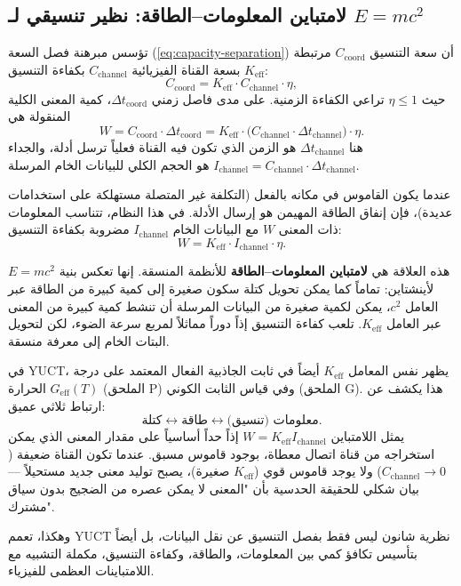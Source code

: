 \documentclass[12pt,a4paper]{article}
\theoremstyle{remark}
\begin{document}
	\subsection{لامتباين المعلومات–الطاقة: نظير تنسيقي لـ \(E=mc^2\)}
	\label{subsec:info_energy_invariant}
	
	تؤسس مبرهنة فصل السعة (\ref{eq:capacity-separation}) أن سعة التنسيق \(C_{\text{coord}}\) مرتبطة بسعة القناة الفيزيائية \(C_{\text{channel}}\) بكفاءة التنسيق \(K_{\mathrm{eff}}\):
	\[
	C_{\text{coord}} = K_{\mathrm{eff}} \cdot C_{\text{channel}} \cdot \eta,
	\]
	حيث \(\eta \le 1\) تراعي الكفاءة الزمنية. على مدى فاصل زمني \(\Delta t_{\text{coord}}\)، كمية المعنى الكلية المنقولة هي
	\[
	W = C_{\text{coord}} \cdot \Delta t_{\text{coord}} = K_{\mathrm{eff}} \cdot \bigl( C_{\text{channel}} \cdot \Delta t_{\text{channel}} \bigr) \cdot \eta.
	\]
	هنا \(\Delta t_{\text{channel}}\) هو الزمن الذي تكون فيه القناة فعلياً ترسل أدلة، والجداء \(I_{\text{channel}} = C_{\text{channel}} \cdot \Delta t_{\text{channel}}\) هو الحجم الكلي للبيانات الخام المرسلة.
	
	عندما يكون القاموس في مكانه بالفعل (التكلفة غير المتصلة مستهلكة على استخدامات عديدة)، فإن إنفاق الطاقة المهيمن هو إرسال الأدلة. في هذا النظام، تتناسب المعلومات ذات المعنى \(W\) مع البيانات الخام \(I_{\text{channel}}\) مضروبة بكفاءة التنسيق:
	\[
	\boxed{W = K_{\mathrm{eff}} \cdot I_{\text{channel}} \cdot \eta}.
	\]
	
	هذه العلاقة هي \textbf{لامتباين المعلومات–الطاقة} للأنظمة المنسقة. إنها تعكس بنية \(E = m c^2\) لأينشتاين: تماماً كما يمكن تحويل كتلة سكون صغيرة إلى كمية كبيرة من الطاقة عبر العامل \(c^2\)، يمكن لكمية صغيرة من البيانات المرسلة أن تنشط كمية كبيرة من المعنى عبر العامل \(K_{\mathrm{eff}}\). تلعب كفاءة التنسيق إذاً دوراً مماثلاً لمربع سرعة الضوء، لكن لتحويل البتات الخام إلى معرفة منسقة.
	
	في YUCT، يظهر نفس المعامل \(K_{\mathrm{eff}}\) أيضاً في ثابت الجاذبية الفعال المعتمد على درجة الحرارة \(G_{\text{eff}}(T)\) (الملحق P) وفي قياس الثابت الكوني (الملحق G). هذا يكشف عن ارتباط ثلاثي عميق:
	\[
	\text{كتلة} \leftrightarrow \text{طاقة} \leftrightarrow \text{معلومات (تنسيق)}.
	\]
	يمثل اللامتباين \(W = K_{\mathrm{eff}} I_{\text{channel}}\) إذاً حداً أساسياً على مقدار المعنى الذي يمكن استخراجه من قناة اتصال معطاة، بوجود قاموس مسبق. عندما تكون القناة ضعيفة (\(C_{\text{channel}} \to 0\)) ولا يوجد قاموس قوي (\(K_{\mathrm{eff}}\) صغيرة)، يصبح توليد معنى جديد مستحيلاً — بيان شكلي للحقيقة الحدسية بأن "المعنى لا يمكن عصره من الضجيج بدون سياق مشترك".
	
	وهكذا، تعمم YUCT نظرية شانون ليس فقط بفصل التنسيق عن نقل البيانات، بل أيضاً بتأسيس تكافؤ كمي بين المعلومات، والطاقة، وكفاءة التنسيق، مكملة التشبيه مع اللامتباينات العظمى للفيزياء.
	
\end{document}

